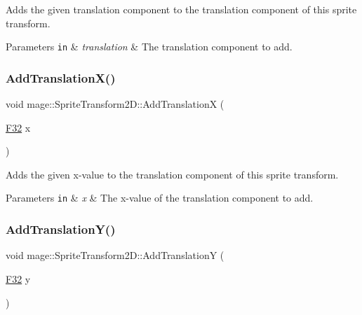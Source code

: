 Adds the given translation component to the translation component of this sprite transform.


\begin{DoxyParams}[1]{Parameters}
\mbox{\tt in}  & {\em translation} & The translation component to add. \\
\hline
\end{DoxyParams}
\mbox{\label{classmage_1_1_sprite_transform2_d_a5370564c49658402f24a42216eea12a2}} 
\subsubsection{\texorpdfstring{Add\+Translation\+X()}{AddTranslationX()}}
{\footnotesize\ttfamily void mage\+::\+Sprite\+Transform2\+D\+::\+Add\+TranslationX (\begin{DoxyParamCaption}\item[{\mbox{\hyperlink{namespacemage_aa97e833b45f06d60a0a9c4fc22ae02c0}{F32}}}]{x }\end{DoxyParamCaption})\hspace{0.3cm}{\ttfamily [noexcept]}}

Adds the given x-\/value to the translation component of this sprite transform.


\begin{DoxyParams}[1]{Parameters}
\mbox{\tt in}  & {\em x} & The x-\/value of the translation component to add. \\
\hline
\end{DoxyParams}
\mbox{\label{classmage_1_1_sprite_transform2_d_a1628a0e11218c13e578293e68e3e14cd}} 
\subsubsection{\texorpdfstring{Add\+Translation\+Y()}{AddTranslationY()}}
{\footnotesize\ttfamily void mage\+::\+Sprite\+Transform2\+D\+::\+Add\+TranslationY (\begin{DoxyParamCaption}\item[{\mbox{\hyperlink{namespacemage_aa97e833b45f06d60a0a9c4fc22ae02c0}{F32}}}]{y }\end{DoxyParamCaption})\hspace{0.3cm}{\ttfamily [noexcept]}}

